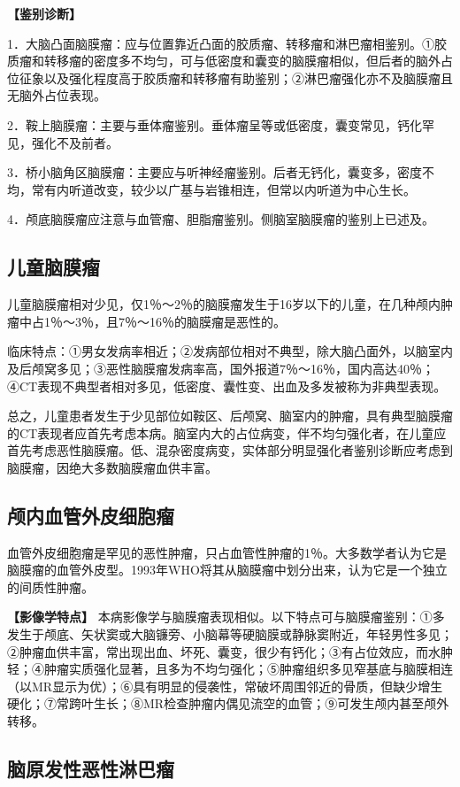 \textbf{【鉴别诊断】}

1．大脑凸面脑膜瘤：应与位置靠近凸面的胶质瘤、转移瘤和淋巴瘤相鉴别。①胶质瘤和转移瘤的密度多不均匀，可与低密度和囊变的脑膜瘤相似，但后者的脑外占位征象以及强化程度高于胶质瘤和转移瘤有助鉴别；②淋巴瘤强化亦不及脑膜瘤且无脑外占位表现。

2．鞍上脑膜瘤：主要与垂体瘤鉴别。垂体瘤呈等或低密度，囊变常见，钙化罕见，强化不及前者。

3．桥小脑角区脑膜瘤：主要应与听神经瘤鉴别。后者无钙化，囊变多，密度不均，常有内听道改变，较少以广基与岩锥相连，但常以内听道为中心生长。

4．颅底脑膜瘤应注意与血管瘤、胆脂瘤鉴别。侧脑室脑膜瘤的鉴别上已述及。

\subsection{儿童脑膜瘤}

儿童脑膜瘤相对少见，仅1％～2％的脑膜瘤发生于16岁以下的儿童，在几种颅内肿瘤中占1％～3％，且7％～16％的脑膜瘤是恶性的。

临床特点：①男女发病率相近；②发病部位相对不典型，除大脑凸面外，以脑室内及后颅窝多见；③恶性脑膜瘤发病率高，国外报道7％～16％，国内高达40％；④CT表现不典型者相对多见，低密度、囊性变、出血及多发被称为非典型表现。

总之，儿童患者发生于少见部位如鞍区、后颅窝、脑室内的肿瘤，具有典型脑膜瘤的CT表现者应首先考虑本病。脑室内大的占位病变，伴不均匀强化者，在儿童应首先考虑恶性脑膜瘤。低、混杂密度病变，实体部分明显强化者鉴别诊断应考虑到脑膜瘤，因绝大多数脑膜瘤血供丰富。

\subsection{颅内血管外皮细胞瘤}

血管外皮细胞瘤是罕见的恶性肿瘤，只占血管性肿瘤的1％。大多数学者认为它是脑膜瘤的血管外皮型。1993年WHO将其从脑膜瘤中划分出来，认为它是一个独立的间质性肿瘤。

\textbf{【影像学特点】}
本病影像学与脑膜瘤表现相似。以下特点可与脑膜瘤鉴别：①多发生于颅底、矢状窦或大脑镰旁、小脑幕等硬脑膜或静脉窦附近，年轻男性多见；②肿瘤血供丰富，常出现出血、坏死、囊变，很少有钙化；③有占位效应，而水肿轻；④肿瘤实质强化显著，且多为不均匀强化；⑤肿瘤组织多见窄基底与脑膜相连（以MR显示为优）；⑥具有明显的侵袭性，常破坏周围邻近的骨质，但缺少增生硬化；⑦常跨叶生长；⑧MR检查肿瘤内偶见流空的血管；⑨可发生颅内甚至颅外转移。

\subsection{脑原发性恶性淋巴瘤}

